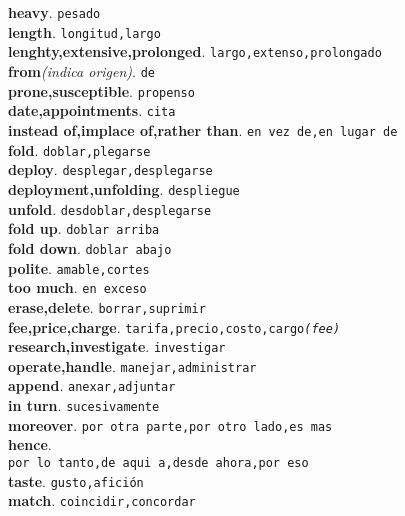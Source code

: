 \documentclass[twocolumn]{article}
\begin{document}
	\textsf{\textbf{heavy}}. \texttt{pesado}\\
	\textsf{\textbf{length}}. \texttt{longitud,largo}\\
	\textsf{\textbf{lenghty,extensive,prolonged}}. \texttt{largo,extenso,prolongado}\\
	\textsf{\textbf{from}}{\scriptsize \textsl{(indica origen)}}. \texttt{de}\\
	\textsf{\textbf{prone,susceptible}}. \texttt{propenso}\\
	\textsf{\textbf{date,appointments}}. \texttt{cita}\\
	\textsf{\textbf{instead of,implace of,rather than}}. \texttt{en vez de,en lugar de}\\
	\textsf{\textbf{fold}}. \texttt{doblar,plegarse}\\
	\textsf{\textbf{deploy}}. \texttt{desplegar,desplegarse}\\
	\textsf{\textbf{deployment,unfolding}}. \texttt{despliegue}\\
	\textsf{\textbf{unfold}}. \texttt{desdoblar,desplegarse}\\
	\textsf{\textbf{fold up}}. \texttt{doblar arriba}\\
	\textsf{\textbf{fold down}}. \texttt{doblar abajo}\\
	\textsf{\textbf{polite}}. \texttt{amable,cortes}\\
	\textsf{\textbf{too much}}. \texttt{en exceso}\\
	\textsf{\textbf{erase,delete}}. \texttt{borrar,suprimir}\\
	\textsf{\textbf{fee,price,charge}}. \texttt{tarifa,precio,costo,cargo{\scriptsize \textsl{(fee)}}}\\
	\textsf{\textbf{research,investigate}}. \texttt{investigar}\\
	\textsf{\textbf{operate,handle}}. \texttt{manejar,administrar}\\
	\textsf{\textbf{append}}. \texttt{anexar,adjuntar}\\
	\textsf{\textbf{in turn}}. \texttt{sucesivamente}\\
	\textsf{\textbf{moreover}}. \texttt{por otra parte,por otro lado,es mas}\\
	\textsf{\textbf{hence}}.\\\texttt{por lo tanto,de aqui a,desde ahora,por eso}\\
	\textsf{\textbf{taste}}. \texttt{gusto,afici\'on}\\
	\textsf{\textbf{match}}. \texttt{coincidir,concordar}\\
\end{document}
